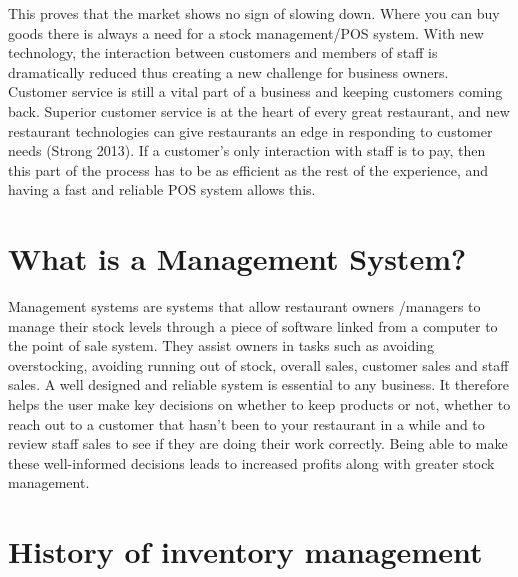 This proves that the market shows no sign of slowing down. Where you can buy goods there is always a need for a stock management/POS system. 
\newline
\newline
With new technology, the interaction between customers and members of staff is dramatically reduced thus creating a new challenge for business owners. Customer service is still a vital part of a business and keeping customers coming back. Superior customer service is at the heart of every great restaurant, and new restaurant technologies can give restaurants an edge in responding to customer needs (Strong 2013). If a customer’s only interaction with staff is to pay, then this part of the process has to be as efficient as the rest of the experience, and having a fast and reliable POS system allows this. 

\section{What is a Management System?}
Management systems are systems that allow restaurant owners /managers to manage their stock levels through a piece of software linked from a computer to the point of sale system. They assist owners in tasks such as avoiding overstocking, avoiding running out of stock, overall sales, customer sales and staff sales. A well designed and reliable system is essential to any business. It therefore helps the user make key decisions on whether to keep products or not, whether to reach out to a customer that hasn't been to your restaurant in a while and to review staff sales to see if they are doing their work correctly. Being able to make these well-informed decisions leads to increased profits along with greater stock management.

\section{History of inventory management}

